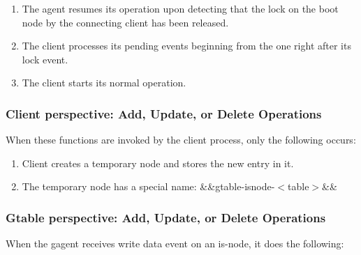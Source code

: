 \begin{enumerate}
\item The agent resumes its operation upon detecting that the lock on the
  boot node by the connecting client has been released.
  
\item The client processes its pending events beginning from the one right
  after its lock event.

\item The client starts its normal operation.

\end{enumerate}



\subsubsection{Client perspective: Add, Update, or Delete Operations}

When these functions are invoked by the client process,
only the following occurs:

\begin{enumerate}
  
\item Client creates a temporary node and stores the new entry in it.

\item The temporary node has a special name:  \&\&gtable-isnode-$<$table$>$\&\&

\end{enumerate}

\subsubsection{Gtable perspective: Add, Update, or Delete Operations}

When the gagent receives write data event on an is-node, it does
the following:

